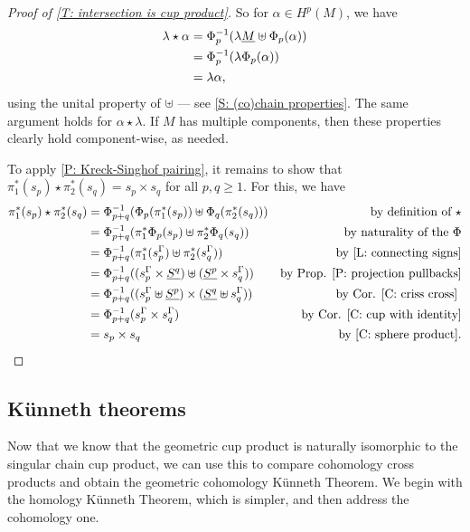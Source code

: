 \begin{proof}[Proof of \cref{T: intersection is cup product}]
	So for $\alpha \in H^p(M)$, we have
	\begin{align*}
		\lambda \star \alpha
		& = \Phi_p^{-1}(\lambda\underline{M} \uplus \Phi_p(\alpha)) \\
		& = \Phi_p^{-1}(\lambda\Phi_p(\alpha)) \\
		& = \lambda\alpha,
	\end{align*}
	using the unital property of $\uplus$ --- see \cref{S: (co)chain properties}.
	The same argument holds for $\alpha\star \lambda$.
	If $M$ has multiple components, then these properties clearly hold component-wise, as needed.

	To apply \cref{P: Kreck-Singhof pairing}, it remains to show that $\pi_1^*(s_p) \star \pi_2^*(s_q) = s_p \times s_q$ for all $p,q\geq 1$.
	For this, we have
	\begin{align*}
		\pi_1^*(s_p) \star \pi_2^*(s_q)& = \Phi_{p+q}^{-1}(\Phi_p(\pi_1^*(s_p))\uplus\Phi_q(\pi_2^*(s_q)))&\text{by definition of $\star$}\\
		& = \Phi_{p+q}^{-1}(\pi_1^*\Phi_p(s_p)\uplus\pi_2^*\Phi_q(s_q))&\text{by naturality of the $\Phi$}\\
		& = \Phi_{p+q}^{-1}(\pi_1^*(s_p^\Gamma)\uplus\pi_2^*(s_q^\Gamma))&\text{by \cref{L: connecting signs}}\\
		& = \Phi_{p+q}^{-1}((s_p^\Gamma \times \underline{S^q})\uplus(\underline{S^p} \times s_q^\Gamma))&\text{by Prop.
			\ref{P: projection pullbacks}}\\
		& = \Phi_{p+q}^{-1}((s_p^\Gamma\uplus \underline{S^p})\times( \underline{S^q}\uplus s_q^\Gamma))&\text{by Cor.
			\ref{C: criss cross} }\\
		& = \Phi_{p+q}^{-1}(s_p^\Gamma \times s_q^\Gamma)&\text{by Cor.
			\ref{C: cup with identity}}\\
		& = s_p \times s_q & \text{by \cref{C: sphere product}}.
	\end{align*}
\end{proof}

\subsection{K\"unneth theorems}

Now that we know that the geometric cup product is naturally isomorphic to the singular chain cup product, we can use this to compare cohomology cross products and obtain the geometric cohomology K\"unneth Theorem.
We begin with the homology K\"unneth Theorem, which is simpler, and then address the cohomology one.

